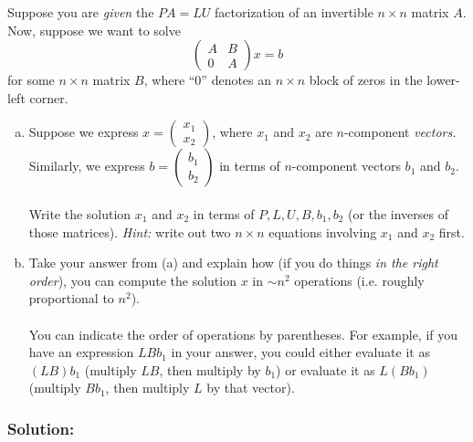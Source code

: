 \documentclass{article}
\begin{document}
Suppose you are \emph{given} the $PA=LU$ factorization of an invertible
$n\times n$ matrix $A$. Now, suppose we want to solve 
\[
\left(\begin{array}{cc}
A & B\\
0 & A
\end{array}\right)x=b
\]
for some $n\times n$ matrix $B$, where ``0'' denotes an $n\times n$
block of zeros in the lower-left corner.
\begin{enumerate}[(a)]
\item Suppose we express $x=\left(\begin{array}{c}
x_{1}\\
x_{2}
\end{array}\right)$, where $x_{1}$ and $x_{2}$ are $n$-component \emph{vectors. }Similarly,
we express $b=\left(\begin{array}{c}
b_{1}\\
b_{2}
\end{array}\right)$ in terms of $n$-component vectors $b_{1}$ and $b_{2}$.\\
\\
Write the solution $x_{1}$ and $x_{2}$ in terms of $P,L,U,B,b_{1},b_{2}$
(or the inverses of those matrices). \emph{Hint:} write out two $n\times n$
equations involving $x_{1}$ and $x_{2}$ first.
\item Take your answer from (a) and explain how (if you do things \emph{in
the right order}), you can compute the solution $x$ in $\sim n^{2}$
operations (i.e. roughly proportional to $n^{2}$).\\
\\
You can indicate the order of operations by parentheses. For example,
if you have an expression $LBb_{1}$ in your answer, you could either
evaluate it as $(LB)b_{1}$ (multiply $LB$, then multiply by $b_{1}$)
or evaluate it as $L(Bb_{1})$ (multiply $Bb_{1}$, then multiply
$L$ by that vector).
\end{enumerate}

\subsubsection*{Solution:}
\end{document}
